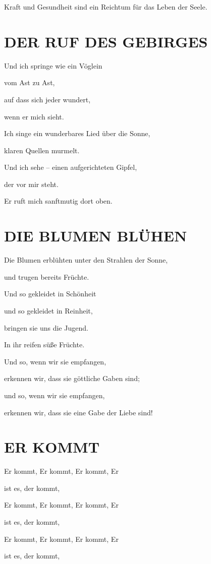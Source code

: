 \documentclass[11pt,a5paper,twoside]{article}
\begin{document}
Kraft und Gesundheit sind ein Reichtum für das Leben der Seele.

\section[Der Ruf des Gebirges]{DER RUF DES GEBIRGES}

Und ich springe wie ein Vöglein 

vom Ast zu Ast, 

auf dass sich jeder wundert, 

wenn er mich sieht.

Ich singe ein wunderbares Lied über die Sonne,

klaren Quellen murmelt.

Und ich sehe -- einen aufgerichteten Gipfel,

der vor mir steht.

Er ruft mich sanftmutig dort oben. 

\section[Die Blumen blühen]{DIE BLUMEN BLÜHEN}

Die Blumen erblühten unter den Strahlen der Sonne,

und trugen bereits Früchte. 

Und so gekleidet in Schönheit

und so gekleidet in Reinheit,

bringen sie uns die Jugend. 

In ihr reifen süße Früchte.

Und so, wenn wir sie empfangen, 

erkennen wir, dass sie göttliche Gaben sind;

und so, wenn wir sie empfangen,

erkennen wir, dass sie eine Gabe der Liebe sind!


\section[Er kommt]{ER KOMMT} 


Er kommt, Er kommt, Er kommt, Er

ist es, der kommt,

Er kommt, Er kommt, Er kommt, Er

ist es, der kommt,

Er kommt, Er kommt, Er kommt, Er

ist es, der kommt,
\end{document}
